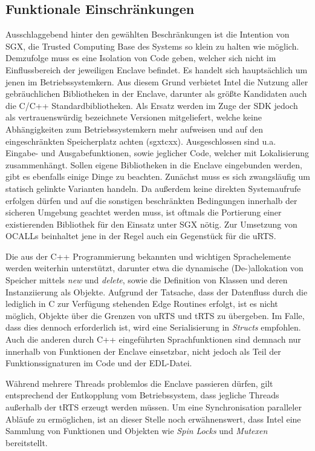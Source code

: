 \subsection{Funktionale Einschränkungen}

Ausschlaggebend hinter den gewählten Beschränkungen ist die Intention von SGX, die Trusted Computing Base des Systems so klein zu halten wie möglich. Demzufolge muss es eine Isolation von Code geben, welcher sich nicht im Einflussbereich der jeweiligen Enclave befindet. Es handelt sich hauptsächlich um jenen im Betriebssystemkern. Aus diesem Grund verbietet Intel die Nutzung aller gebräuchlichen Bibliotheken in der Enclave, darunter als größte Kandidaten auch die C/C++ Standardbibliotheken. Als Ersatz werden im Zuge der SDK jedoch als vertrauenswürdig bezeichnete Versionen mitgeliefert, welche keine Abhängigkeiten zum Betriebssystemkern mehr aufweisen und auf den eingeschränkten Speicherplatz achten (sgx\textunderscore tcxx). Ausgeschlossen sind u.a. Eingabe- und Ausgabefunktionen, sowie jeglicher Code, welcher mit Lokalisierung zusammenhängt. Sollen eigene Bibliotheken in die Enclave eingebunden werden, gibt es ebenfalls einige Dinge zu beachten. Zunächst muss es sich zwangsläufig um statisch gelinkte Varianten handeln. Da außerdem keine direkten Systemaufrufe erfolgen dürfen und auf die sonstigen beschränkten Bedingungen innerhalb der sicheren Umgebung geachtet werden muss, ist oftmals die Portierung einer existierenden Bibliothek für den Einsatz unter SGX nötig. Zur Umsetzung von OCALLs beinhaltet jene in der Regel auch ein Gegenstück für die uRTS.
 
Die aus der C++ Programmierung bekannten und wichtigen Sprachelemente werden weiterhin unterstützt, darunter etwa die dynamische (De-)allokation von Speicher mittels \textit{new} und \textit{delete}, sowie die Definition von Klassen und deren Instanziierung als Objekte. Aufgrund der Tatsache, dass der Datenfluss durch die lediglich in C zur Verfügung stehenden Edge Routines erfolgt, ist es nicht möglich, Objekte über die Grenzen von uRTS und tRTS zu übergeben. Im Falle, dass dies dennoch erforderlich ist, wird eine Serialisierung in \textit{Structs} empfohlen. Auch die anderen durch C++ eingeführten Sprachfunktionen sind demnach nur innerhalb von Funktionen der Enclave einsetzbar, nicht jedoch als Teil der Funktionssignaturen im Code und der EDL-Datei.

Während mehrere Threads problemlos die Enclave passieren dürfen, gilt entsprechend der Entkopplung vom Betriebssystem, dass jegliche Threads außerhalb der tRTS erzeugt werden müssen. Um eine Synchronisation paralleler Abläufe zu ermöglichen, ist an dieser Stelle noch erwähnenswert, dass Intel eine Sammlung von Funktionen und Objekten wie \textit{Spin Locks} und \textit{Mutexen} bereitstellt.

